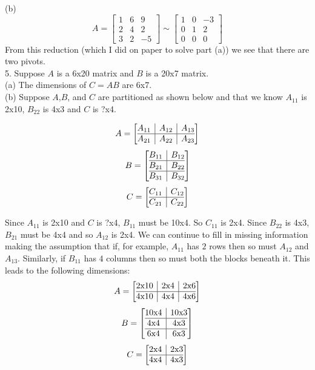 \documentclass[11pt]{article}
\begin{document}
(b)
$$ A = \begin{bmatrix}
1 & 6 & 9 \\ 2 & 4 & 2 \\ 3 & 2 & -5
\end{bmatrix}
\sim \begin{bmatrix}
1 & 0 & -3 \\ 0 & 1 & 2 \\ 0 & 0 & 0
\end{bmatrix}$$
From this reduction (which I did on paper to solve part (a)) we see that there are two pivots.\\

5. Suppose $A$ is a 6x20 matrix and $B$ is a 20x7 matrix.\\

(a) The dimensions of $C = AB$ are 6x7.\\

(b) Suppose $A$,$B$, and $C$ are partitioned as shown below and that we know $A_{11}$ is 2x10, $B_{22}$ is 4x3 and $C$ is ?x4.

\[
  A = \left[\begin{array}{@{}c|c|c@{}}
    A_{11} & A_{12} & A_{13} \\ \hline
    A_{21} & A_{22} & A_{23}
  \end{array}\right]
\]
\[
  B = \left[\begin{array}{@{}c|c@{}}
    B_{11} & B_{12} \\ \hline
    B_{21} & B_{22}  \\ \hline
    B_{31} & B_{32}
  \end{array}\right]
\]
\[
  C = \left[\begin{array}{@{}c|c@{}}
    C_{11} & C_{12} \\ \hline
    C_{21} & C_{22}  \\
  \end{array}\right]
\]

Since $A_{11}$ is 2x10 and $C$ is ?x4, $B_{11}$ must be 10x4. So $C_{11}$ is 2x4. Since $B_{22}$ is 4x3, $B_{21}$ must be 4x4 and so $A_{12}$ is 2x4. We can continue to fill in missing information making the assumption that if, for example, $A_{11}$ has $2$ rows then so must $A_{12}$ and $A_{13}$. Similarly, if $B_{11}$ has $4$ columns then so must both the blocks beneath it. This leads to the following dimensions:
\[
  A = \left[\begin{array}{@{}c|c|c@{}}
    $2x10$ & $2x4$ & $2x6$ \\ \hline
    $4x10$ & $4x4$ & $4x6$
  \end{array}\right]
\]
\[
  B = \left[\begin{array}{@{}c|c@{}}
    $10x4$ & $10x3$ \\ \hline
    $4x4$ & $4x3$  \\ \hline
    $6x4$ & $6x3$
  \end{array}\right]
\]
\[
  C = \left[\begin{array}{@{}c|c@{}}
    $2x4$ & $2x3$ \\ \hline
    $4x4$ & $4x3$  \\
  \end{array}\right]
\]
\end{document}
